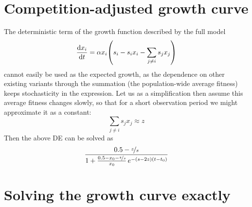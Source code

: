 \documentclass[pdftex,12pt,a4paper]{scrartcl}
\begin{document}
\section{Competition-adjusted growth curve}

The deterministic term of the growth function described by the full model
\begin{equation}
    \dv{x_i}{t} = \alpha x_i \qty( s_i - s_i x_i - \sum_{j \neq i} s_j x_j )
\end{equation}
cannot easily be used as the expected growth, as the dependence on other existing variants through the summation (the population-wide average fitness) keeps stochasticity in the expression. Let us as a simplification then assume this average fitness changes slowly, so that for a short observation period we might approximate it as a constant:
\begin{equation}
    \sum_{j \neq i} s_j x_j \approx z
\end{equation}
Then the above DE can be solved as 
\begin{equation}
    \frac{0.5-\nicefrac{z}{s}}{1 +  \frac{0.5-x_0-\nicefrac{z}{s}}{x_0} \,  e^{- \qty(s - 2z) (t-t_0) }}
\end{equation}


\section{Solving the growth curve exactly}
\end{document}
